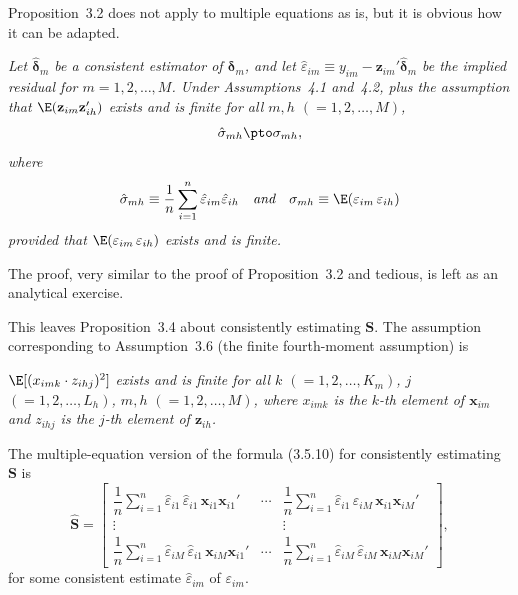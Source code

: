 Proposition~3.2 does not apply to multiple equations as is, but it is obvious how
it can be adapted.

\begin{proposition}
\label{prop:4.1}
\textit{Let\/ $\hat{\boldsymbol{\delta}}_m$ be a consistent estimator of\/
$\boldsymbol{\delta}_m$, and let\/
$\hat{\varepsilon}_{im} \equiv y_{im} - \mathbf{z}_{im}' \hat{\boldsymbol{\delta}}_m$ be
the implied residual for $m = 1, 2, \ldots, M$.
Under Assumptions~4.1 and~4.2, plus the assumption that\/
$\E(\mathbf{z}_{im} \mathbf{z}_{ih}')$ exists and is finite for all
$m, h$ $(= 1, 2, \ldots, M)$,}
\begin{equation}
\hat{\sigma}_{mh} \pto \sigma_{mh},
\label{eq:4.3.1}
\end{equation}
\textit{where}
\[
\hat{\sigma}_{mh} \equiv \frac{1}{n} \sum_{i=1}^{n} \hat{\varepsilon}_{im} \hat{\varepsilon}_{ih}
\quad \textit{and} \quad
\sigma_{mh} \equiv \E(\varepsilon_{im}\, \varepsilon_{ih})
\]
\textit{provided that\/ $\E(\varepsilon_{im}\, \varepsilon_{ih})$ exists and is finite.}
\end{proposition}

The proof, very similar to the proof of Proposition~3.2 and tedious, is left as an
analytical exercise.

This leaves Proposition~3.4 about consistently estimating $\mathbf{S}$. The assumption
corresponding to Assumption~3.6 (the finite fourth-moment assumption) is

\begin{assumption}
\label{ass:4.6}
$\E[(x_{imk} \cdot z_{ihj})^2]$ \textit{exists and is finite for
all $k$ $(= 1, 2, \ldots, K_m)$, $j$ $(= 1, 2, \ldots, L_h)$,
$m, h$ $(= 1, 2, \ldots, M)$, where $x_{imk}$ is the $k$-th element of\/
$\mathbf{x}_{im}$ and $z_{ihj}$ is the $j$-th element of\/ $\mathbf{z}_{ih}$.}
\end{assumption}

The multiple-equation version of the formula (3.5.10) for consistently estimating
$\mathbf{S}$ is
\begin{equation}
\widehat{\mathbf{S}} = \begin{bmatrix}
\dfrac{1}{n} \displaystyle\sum_{i=1}^{n}
\hat{\varepsilon}_{i1}\, \hat{\varepsilon}_{i1}\,
\mathbf{x}_{i1} \mathbf{x}_{i1}' & \cdots &
\dfrac{1}{n} \displaystyle\sum_{i=1}^{n}
\hat{\varepsilon}_{i1}\, \hat{\varepsilon}_{iM}\,
\mathbf{x}_{i1} \mathbf{x}_{iM}' \\[8pt]
\vdots & & \vdots \\[4pt]
\dfrac{1}{n} \displaystyle\sum_{i=1}^{n}
\hat{\varepsilon}_{iM}\, \hat{\varepsilon}_{i1}\,
\mathbf{x}_{iM} \mathbf{x}_{i1}' & \cdots &
\dfrac{1}{n} \displaystyle\sum_{i=1}^{n}
\hat{\varepsilon}_{iM}\, \hat{\varepsilon}_{iM}\,
\mathbf{x}_{iM} \mathbf{x}_{iM}'
\end{bmatrix},
\label{eq:4.3.2}
\end{equation}
for some consistent estimate $\hat{\varepsilon}_{im}$ of $\varepsilon_{im}$.

